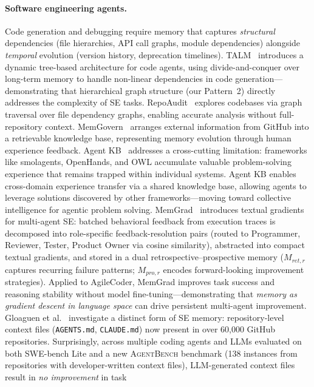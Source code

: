 \documentclass[hf]{ceurart}
\begin{document}
\paragraph{Software engineering agents.}
Code generation and debugging require memory that captures
\emph{structural} dependencies (file hierarchies, API call graphs,
module dependencies) alongside \emph{temporal} evolution (version
history, deprecation timelines). TALM~\cite{talm2025} introduces a
dynamic tree-based architecture for code agents, using divide-and-conquer
over long-term memory to handle non-linear dependencies in code
generation---demonstrating that hierarchical graph structure (our
Pattern~2) directly addresses the complexity of SE tasks.
RepoAudit~\cite{repoaudit2025} explores codebases via graph traversal
over file dependency graphs, enabling accurate analysis without
full-repository context. MemGovern~\cite{memgovern2025} arranges
external information from GitHub into a retrievable knowledge base,
representing memory evolution through human experience feedback.
Agent KB~\cite{agentkb2025} addresses a cross-cutting limitation:
frameworks like smolagents, OpenHands, and OWL accumulate valuable
problem-solving experience that remains trapped within individual
systems. Agent KB enables cross-domain experience transfer via a
shared knowledge base, allowing agents to leverage solutions
discovered by other frameworks---moving toward collective intelligence
for agentic problem solving.
MemGrad~\cite{memgrad2026} introduces textual gradients for
multi-agent SE: batched behavioral feedback from execution traces
is decomposed into role-specific feedback-resolution pairs (routed
to Programmer, Reviewer, Tester, Product Owner via cosine similarity),
abstracted into compact textual gradients, and stored in a dual
retrospective--prospective memory ($M_{ret,r}$ captures recurring
failure patterns; $M_{pro,r}$ encodes forward-looking improvement
strategies). Applied to AgileCoder, MemGrad improves task success
and reasoning stability without model fine-tuning---demonstrating
that \emph{memory as gradient descent in language space} can drive
persistent multi-agent improvement.
Gloaguen et al.~\cite{agentsmd2026} investigate a distinct form of
SE memory: repository-level context files (\texttt{AGENTS.md},
\texttt{CLAUDE.md}) now present in over 60,000 GitHub repositories.
Surprisingly, across multiple coding agents and LLMs evaluated on
both SWE-bench Lite and a new \textsc{AgentBench} benchmark (138
instances from repositories with developer-written context files),
LLM-generated context files result in \emph{no improvement} in task
\end{document}
